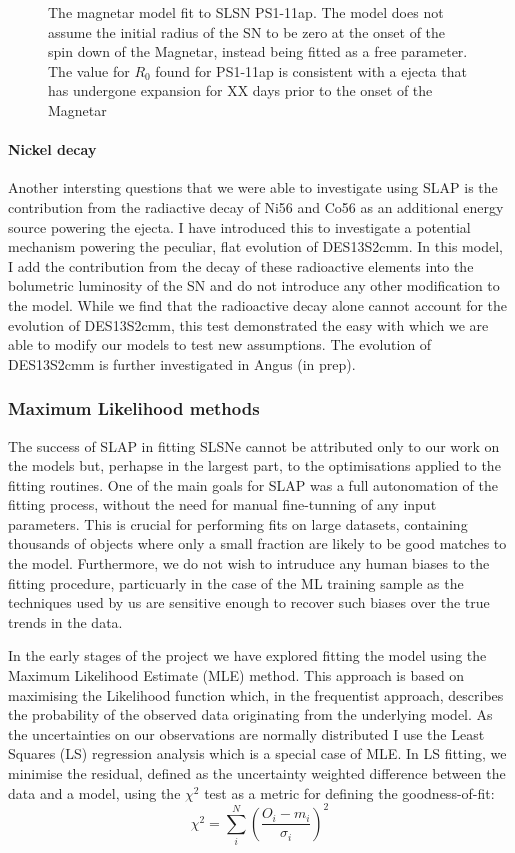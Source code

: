 \begin{figure}
  \caption{The magnetar model fit to SLSN PS1-11ap. The model does not assume the initial radius of the SN to be zero at the onset of the spin down of the Magnetar, instead being fitted as a free parameter. The value for $R_0$ found for PS1-11ap is consistent with a ejecta that has undergone expansion for XX days prior to the onset of the Magnetar}
  \label{fig:PS1-11apR0}
\end{figure}

\paragraph{Nickel decay}
Another intersting questions that we were able to investigate using \textsc{SLAP} is the contribution from the radiactive decay of Ni56 and Co56 as an additional energy source powering the ejecta. I have introduced this to investigate a potential mechanism powering the peculiar, flat evolution of DES13S2cmm. In this model, I add the contribution from the decay of these radioactive elements into the bolumetric luminosity of the SN and do not introduce any other modification to the model. While we find that the radioactive decay alone cannot account for the evolution of DES13S2cmm, this test demonstrated the easy with which we are able to modify our models to test new assumptions. The evolution of DES13S2cmm is further investigated in Angus (in prep).

\subsubsection{Maximum Likelihood methods}
The success of \textsc{SLAP} in fitting SLSNe cannot be attributed only to our work on the models but, perhapse in the largest part, to the optimisations applied to the fitting routines. One of the main goals for \textsc{SLAP} was a full autonomation of the fitting process, without the need for manual fine-tunning of any input parameters. This is crucial for performing fits on large datasets, containing thousands of objects where only a small fraction are likely to be good matches to the model. Furthermore, we do not wish to intruduce any human biases to the fitting procedure, particuarly in the case of the ML training sample as the techniques used by us are sensitive enough to recover such biases over the true trends in the data.

In the early stages of the project we have explored fitting the model using the Maximum Likelihood Estimate (MLE) method. This approach is based on maximising the Likelihood function which, in the frequentist approach, describes the probability of the observed data originating from the underlying model. As the uncertainties on our observations are normally distributed I use the Least Squares (LS) regression analysis which is a special case of MLE. In LS fitting, we minimise the residual, defined as the uncertainty weighted difference between the data and a model, using the $\chi^{2}$ test as a metric for defining the goodness-of-fit:
\begin{equation}
  \chi^2 = \sum\limits_i^N \left( \frac{O_i - m_i}{\sigma_i} \right)^2
\end{equation}

